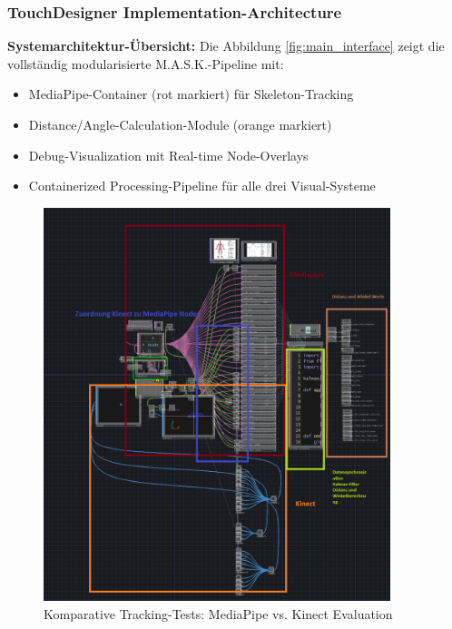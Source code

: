 \subsubsection{TouchDesigner Implementation-Architecture}


\textbf{Systemarchitektur-Übersicht:}
Die Abbildung \ref{fig:main_interface} zeigt die vollständig modularisierte M.A.S.K.-Pipeline mit:
\begin{itemize}
    \item MediaPipe-Container (rot markiert) für Skeleton-Tracking
    \item Distance/Angle-Calculation-Module (orange markiert)
    \item Debug-Visualization mit Real-time Node-Overlays
    \item Containerized Processing-Pipeline für alle drei Visual-Systeme
\end{itemize}

\begin{figure}[H]
    \centering
    \includegraphics[width=0.9\textwidth]{images/docupictures/KinectMediaPipe_Testing.png}
    \caption{Komparative Tracking-Tests: MediaPipe vs. Kinect Evaluation}
    \label{fig:tracking_comparison}
\end{figure}

